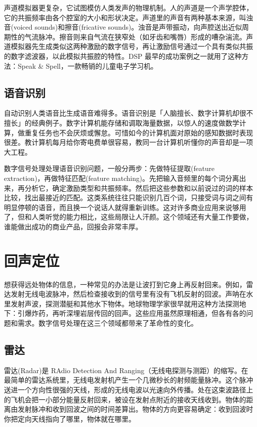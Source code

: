 声道模拟器更复杂，它试图模仿人类发声的物理机制。人的声道是一个声学腔体，它的共振频率由各个腔室的大小和形状决定。声道里的声音有两种基本来源，叫浊音(voiced
sounds)和擦音(fricative
sounds)。浊音是声带振动，向声腔送出近似周期性的气流脉冲。擦音则来自气流在狭窄处（如牙齿和嘴唇）形成的嘈杂湍流。声道模拟器先生成类似这两种激励的数字信号，再让激励信号通过一个具有类似共振的数字滤波器，以此模拟共振腔的特性。DSP
最早的成功案例之一就用了这种方法：Speak \&
Spell，一款畅销的儿童电子学习机。

\subsection{语音识别}

自动识别人类语音比生成语音难得多。语音识别是「人脑擅长、数字计算机却很不擅长」的经典例子。数字计算机能存储和调取海量数据，以惊人的速度做数学计算，做重复任务也不会厌烦或懈怠。可惜如今的计算机面对原始的感知数据时表现很差。教计算机每月给你寄电费单很容易，教同一台计算机听懂你的声音却是一项大工程。

数字信号处理处理语音识别问题，一般分两步：先做特征提取(feature
extraction)，再做特征匹配(feature
matching)。先把输入音频里的每个词分离出来，再分析它，确定激励类型和共振频率。然后把这些参数和以前说过的词的样本比较，找出最接近的匹配。这类系统往往只能识别几百个词，只接受词与词之间有明显停顿的语音，而且换一个说话人就得重新训练。这对许多商业应用来说够用了，但和人类听觉的能力相比，这些局限让人汗颜。这个领域还有大量工作要做，谁能做出成功的商业产品，回报会非常丰厚。

\section{回声定位}

想获得远处物体的信息，一种常见的办法是让波打到它身上再反射回来。例如，雷达发射无线电波脉冲，然后检查接收到的信号里有没有飞机反射的回波。声呐在水里发射声波，探测潜艇和其他水下物体。地球物理学家很早就用这种方法探测地下：引爆炸药，再听深埋岩层传回的回声。这些应用虽然原理相通，但各有各的问题和需求。数字信号处理在这三个领域都带来了革命性的变化。

\subsection{雷达}

雷达(Radar)是 RAdio Detection And
Ranging（无线电探测与测距）的缩写。在最简单的雷达系统里，无线电发射机产生一个几微秒长的射频能量脉冲。这个脉冲送进一个方向性很强的天线，形成的无线电波以光速向外传播。处在这束波路径上的飞机会把一小部分能量反射回来，被设在发射点附近的接收天线收到。物体的距离由发射脉冲和收到回波之间的时间差算出。物体的方向更容易确定：收到回波时你把定向天线指向了哪里，物体就在哪里。

